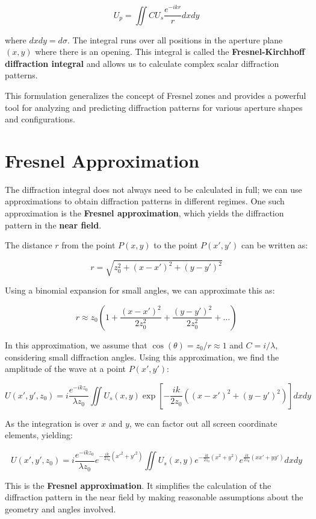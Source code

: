 \documentclass[
  a4paper,
]{book}
\begin{document}
\[
U_p = \iint C U_s \frac{e^{-ikr}}{r} dx dy
\]

where \(dx dy = d\sigma\). The integral runs over all positions in the
aperture plane \((x,y)\) where there is an opening. This integral is
called the \textbf{Fresnel-Kirchhoff diffraction integral} and allows us
to calculate complex scalar diffraction patterns.

This formulation generalizes the concept of Fresnel zones and provides a
powerful tool for analyzing and predicting diffraction patterns for
various aperture shapes and configurations.

\section{Fresnel Approximation}\label{fresnel-approximation}

The diffraction integral does not always need to be calculated in full;
we can use approximations to obtain diffraction patterns in different
regimes. One such approximation is the \textbf{Fresnel approximation},
which yields the diffraction pattern in the \textbf{near field}.

The distance \(r\) from the point \(P(x,y)\) to the point \(P(x',y')\)
can be written as:

\[
r = \sqrt{z_0^2 + (x - x')^2 + (y - y')^2}
\]

Using a binomial expansion for small angles, we can approximate this as:

\[
r \approx z_0 \left(1 + \frac{(x - x')^2}{2z_0^2} + \frac{(y - y')^2}{2z_0^2} + \ldots \right)
\]

In this approximation, we assume that
\(\cos(\theta) = z_0 / r \approx 1\) and \(C = i / \lambda\),
considering small diffraction angles. Using this approximation, we find
the amplitude of the wave at a point \(P(x',y')\):

\[
U(x', y', z_0) = i \frac{e^{-ikz_0}}{\lambda z_0} \iint U_s(x, y) \exp \left[ -\frac{ik}{2z_0} \left( (x - x')^2 + (y - y')^2 \right) \right] dx dy
\]

As the integration is over \(x\) and \(y\), we can factor out all screen
coordinate elements, yielding:

\[
U(x', y', z_0) = i \frac{e^{-ikz_0}}{\lambda z_0} e^{-\frac{ik}{2z_0}(x'^2 + y'^2)} \iint U_s(x, y) e^{-\frac{ik}{2z_0}(x^2 + y^2)} e^{\frac{ik}{2z_0}(xx' + yy')} dx dy
\]

This is the \textbf{Fresnel approximation}. It simplifies the
calculation of the diffraction pattern in the near field by making
reasonable assumptions about the geometry and angles involved.
\end{document}
